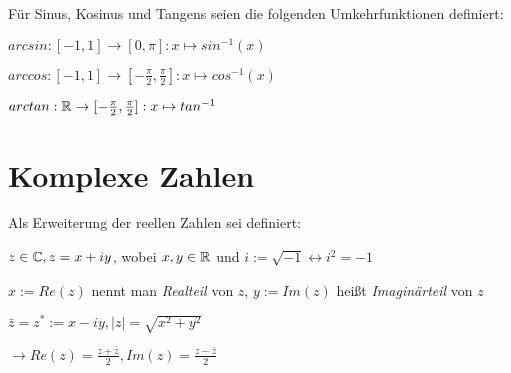 \begin{definition}[Umkehrfunktionen]
Für Sinus, Kosinus und Tangens seien die folgenden Umkehrfunktionen definiert:
	\begin{multicols}{2}
		
	
			\begin{description}[noitemsep]
				\item $arcsin : [-1,1] \rightarrow [0, \pi] : x \mapsto sin^{-1}(x) $
				\item $arccos : [-1,1] \rightarrow [-\frac{\pi}{2},\frac{\pi}{2}] : x \mapsto cos^{-1}(x) $
				\item $arctan : \mathbb{R} \rightarrow [-\frac{\pi}{2},\frac{\pi}{2}] : x \mapsto tan^{-1} $
			\end{description}
	
	\end{multicols}
\end{definition}

\section{Komplexe Zahlen}

\begin{definition}
	Als Erweiterung der reellen Zahlen sei definiert:
	\begin{description}[noitemsep]
		\item $z \in \mathbb{C}, z = x + iy$, wobei $x,y \in \mathbb{R}$ und $i := \sqrt{-1} \leftrightarrow i^2 = -1$
		\item $x := Re(z)$ nennt man \emph{Realteil} von $z$, $y := Im(z)$ heißt \emph{Imaginärteil} von $z$
		\item $\bar{z} = z^* := x - iy, |z| = \sqrt{x^2 + y^2}$
		\item $\rightarrow Re(z) = \frac{z + \bar{z}}{2}, Im(z) = \frac{z - \bar{z}}{2}$
	\end{description}
\end{definition}

